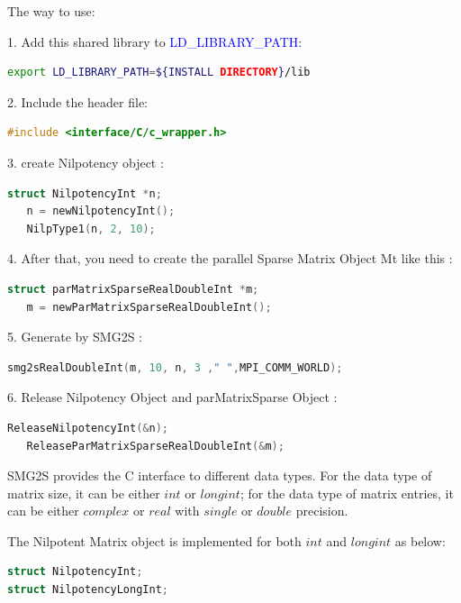 \documentclass[a4paper, 10 pt]{report}
\begin{document}
	The way to use:
	
	1. Add this shared library to \textcolor{blue}{LD\_LIBRARY\_PATH}:
	
	\begin{lstlisting}[language=bash,frame=single]
   export LD_LIBRARY_PATH=${INSTALL DIRECTORY}/lib
	\end{lstlisting}

	2. Include the header file:
	\begin{lstlisting}[language=C,frame=single]
  #include <interface/C/c_wrapper.h>
	\end{lstlisting}
	
	3. create Nilpotency object :
	
	\begin{lstlisting}[language=C,frame=single]
   struct NilpotencyInt *n;
   n = newNilpotencyInt();
   NilpType1(n, 2, 10);
	\end{lstlisting}
	
	4. After that, you need to create the parallel Sparse Matrix Object Mt like this :

	\begin{lstlisting}[language=C,frame=single]
   struct parMatrixSparseRealDoubleInt *m;
   m = newParMatrixSparseRealDoubleInt();
	\end{lstlisting}

	5. Generate by SMG2S :
	
	\begin{lstlisting}[language=C,frame=single]
   smg2sRealDoubleInt(m, 10, n, 3 ," ",MPI_COMM_WORLD);
    \end{lstlisting}

   6. Release Nilpotency Object and parMatrixSparse Object :
	\begin{lstlisting}[language=C,frame=single]
   ReleaseNilpotencyInt(&n);
   ReleaseParMatrixSparseRealDoubleInt(&m);
   \end{lstlisting}

	SMG2S provides the C interface to different data types. For the data type of matrix size, it can be either $int$ or $long int$; for the data type of matrix entries, it can be either $complex$ or $real$ with $single$ or $double$ precision.
	
	The  Nilpotent Matrix object is implemented for both $int$ and $long int$ as below:
		\begin{lstlisting}[language=C,frame=single,	basicstyle=\footnotesize]
struct NilpotencyInt;
struct NilpotencyLongInt;
		\end{lstlisting}
	
\end{document}
